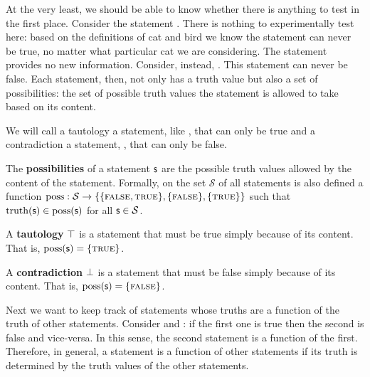 \documentclass[11pt,letterpaper,fleqn]{memoir} %
\begin{document}
At the very least, we should be able to know whether there is anything to test in the first place. Consider the statement . There is nothing to experimentally test here: based on the definitions of cat and bird we know the statement can never be true, no matter what particular cat we are considering. The statement provides no new information. Consider, instead, . This statement can never be false. Each statement, then, not only has a truth value but also a set of possibilities: the set of possible truth values the statement is allowed to take based on its content.

We will call a tautology a statement, like , that can only be true and a contradiction a statement, , that can only be false.

\begin{mathSection}
	
	\begin{axiom}\label{def_possibilities}
		The \textbf{possibilities} of a statement $\mathsf{s}$ are the possible truth values allowed by the content of the statement. Formally, on the set $\mathcal{S}$ of all statements is also defined a function $\operatorname{poss}: \mathcal{S} \to \{\{\textsc{false}, \textsc{true}\},\{\textsc{false}\},\{\textsc{true}\}\}$ such that $\operatorname{truth}(\mathsf{s}) \in \operatorname{poss}(\mathsf{s})$ for all $\mathsf{s} \in \mathcal{S}$.
	\end{axiom}
	
	\begin{defn}
		A \textbf{tautology} $\top$ is a statement that must be true simply because of its content. That is, $\operatorname{poss}(\mathsf{s}) = \{\textsc{true}\}$.
	\end{defn}
	
	\begin{defn}
		A \textbf{contradiction} $\bot$ is a statement that must be false simply because of its content. That is, $\operatorname{poss}(\mathsf{s}) = \{\textsc{false}\}$.
	\end{defn}
	
\end{mathSection}

Next we want to keep track of statements whose truths are a function of the truth of other statements. Consider  and : if the first one is true then the second is false and vice-versa. In this sense, the second statement is a function of the first. Therefore, in general, a statement is a function of other statements if its truth is determined by the truth values of the other statements.
\end{document}
